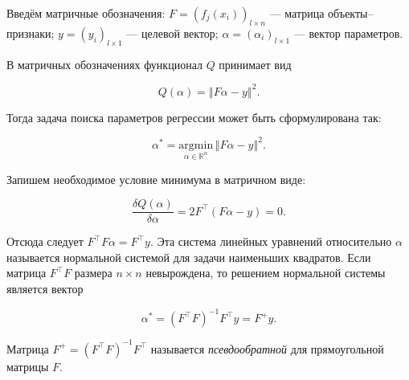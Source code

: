 \documentclass[11pt,a4paper]{article}
\renewcommand{\linethickness}{0.1ex}
\providecommand{\tightlist}{%
      \setlength{\itemsep}{0pt}\setlength{\parskip}{0pt}}
\begin{document}
Введём матричные обозначения:
\(F = \left( f_j(x_i) \right)_{l \times n}\) --- матрица
объекты--признаки; \(y = \left( y_i \right)_{l \times 1}\) --- целевой
вектор; \(\alpha = \left( \alpha_i \right)_{l \times 1}\) --- вектор
параметров.

В матричных обозначениях функционал \(Q\) принимает вид

\[ Q(\alpha) = \left\Vert F\alpha - y \right\Vert^2. \]

Тогда задача поиска параметров регрессии может быть сформулирована так:

\[ \alpha^* = \underset{\alpha \in \mathbb{R}^n}{\text{argmin}} \, {\left\Vert F\alpha - y \right\Vert^2}. \]

Запишем необходимое условие минимума в матричном виде:

\[ \frac{\delta Q(\alpha)}{\delta \alpha} = 2F^\top (F\alpha - y) = 0. \]

Отсюда следует \(F^{\top} F \alpha = F^{\top}y\). Эта система линейных
уравнений относительно \(\alpha\) называется нормальной системой для
задачи наименьших квадратов. Если матрица \(F^{\top} F\) размера
\(n \times n\) невырождена, то решением нормальной системы является
вектор

\[ \alpha^* = (F^{\top} F)^{-1} F^{\top} y = F^{+} y. \]

Матрица \(F^{+} = (F^{\top} F)^{-1} F^{\top}\) называется
\emph{псевдообратной} для прямоугольной матрицы \(F\).

%
%


    
    
    
\end{document}
